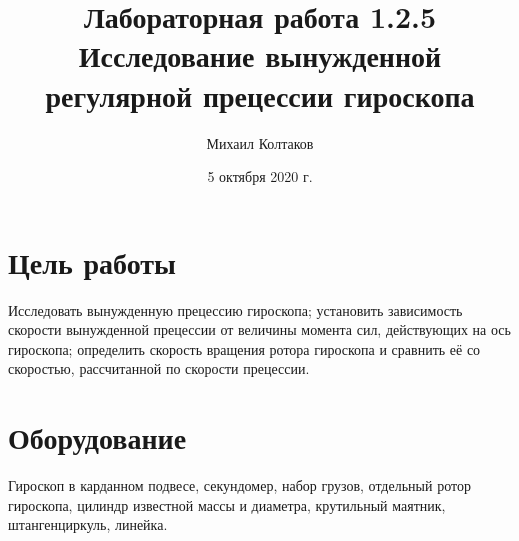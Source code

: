 \documentclass[a4paper, 12pt]{article}
\title{Лабораторная работа 1.2.5 Исследование вынужденной регулярной прецессии гироскопа}
\author{Михаил Колтаков}
\date{5 октября 2020 г.}
\begin{document}
	\maketitle
	\section*{Цель работы}
		Исследовать вынужденную прецессию гироскопа; установить зависимость скорости вынужденной прецессии от величины момента сил, действующих на ось гироскопа; определить скорость вращения ротора гироскопа и сравнить её со скоростью, рассчитанной по скорости прецессии.
	\section*{Оборудование}
		Гироскоп в карданном подвесе, секундомер, набор грузов, отдельный ротор гироскопа, цилиндр известной массы и диаметра, крутильный маятник, штангенциркуль, линейка.
\end{document}
